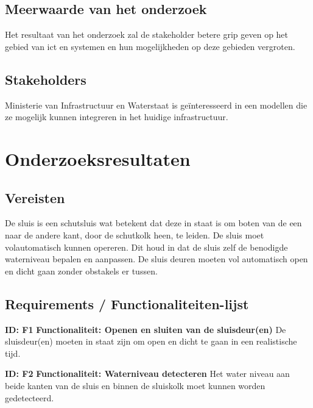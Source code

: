 \documentclass{article}
\begin{document}
\subsection{Meerwaarde van het onderzoek}
Het resultaat van het onderzoek zal de stakeholder betere grip geven op het gebied van ict en systemen en hun mogelijkheden op deze gebieden vergroten. 

\subsection{Stakeholders}
Ministerie van Infrastructuur en Waterstaat is geïnteresseerd in een modellen die ze mogelijk kunnen integreren in het huidige infrastructuur.



\section{Onderzoeksresultaten}

\subsection{Vereisten}

De sluis is een schutsluis wat betekent dat deze in staat is om boten van de een naar de andere kant, door de schutkolk heen, te leiden. De sluis moet volautomatisch kunnen opereren. Dit houd in dat de sluis zelf de benodigde waterniveau bepalen en aanpassen. De sluis deuren moeten vol automatisch open en dicht gaan zonder obstakels er tussen.


\subsection{Requirements / Functionaliteiten-lijst}\label{sec:FuncList}
\textbf{ID: F1} \newline
\textbf{Functionaliteit: Openen en sluiten van de sluisdeur(en)} \newline
De sluisdeur(en) moeten in staat zijn om open en dicht te gaan in een realistische tijd. \newline

\textbf{ID: F2} \newline
\textbf{Functionaliteit: Waterniveau detecteren} \newline
Het water niveau aan beide kanten van de sluis en binnen de sluiskolk moet kunnen worden gedetecteerd. \newline
\end{document}
